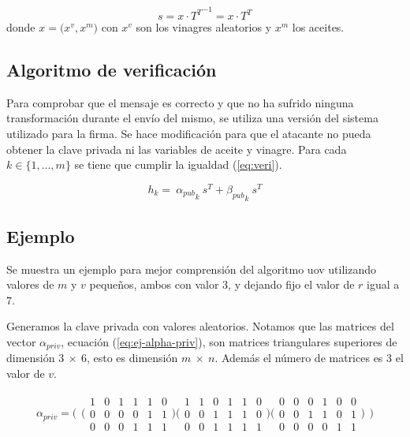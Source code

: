 \begin{equation}\label{eq:firma}
	s = x \cdot {T^{\scriptscriptstyle T}}^{-1} = x \cdot T ^{\scriptscriptstyle T}
\end{equation}
donde $x = \big(x^v, x^m\big)$ con $x^v$ son los vinagres aleatorios y $x^m$ los aceites.




\subsection{Algoritmo de verificación}

Para comprobar que el mensaje es correcto y que no ha sufrido ninguna transformación durante el envío del mismo, se utiliza una versión del sistema utilizado para la firma. Se hace modificación para que el atacante no pueda obtener la clave privada ni las variables de aceite y vinagre. Para cada $k \in  \{1,\dots, m\}$ se tiene que cumplir la igualdad (\ref{eq:veri}).


\begin{equation}\label{eq:veri}
	h_k = \ {\alpha_{pub}}_k \ s^{\scriptscriptstyle T} + {\beta_{pub}}_{k} \ s^{\scriptscriptstyle T}
\end{equation}

\subsection{Ejemplo}

Se muestra un ejemplo para mejor comprensión del algoritmo \acrshort{uov} utilizando valores de $m$ y $v$ pequeños, ambos con valor $3$, y dejando fijo el valor de $r$ igual a $7$.

Generamos la clave privada con valores aleatorios. Notamos que las matrices del vector $\alpha_{priv}$, ecuación (\ref{eq:ej-alpha-priv}), son matrices triangulares superiores de dimensión $3\ \times\ 6$, esto es dimensión $m\ \times\ n$. Además el número de matrices es $3$ el valor de $v$.

\begin{equation}\label{eq:ej-alpha-priv}
{\alpha_{priv}} = 
	\Bigg(\begin{matrix}
	\Big(\begin{smallmatrix}
		1 & 0 & 1 & 1 & 1 & 0\\
		0 & 0 & 0 & 0 & 1 & 1\\
		0 & 0 & 0 & 1 & 1 & 1
	\end{smallmatrix}\Big)
		
	\Big(\begin{smallmatrix}
		1 & 1 & 0 & 1 & 1 & 0\\
		0 & 0 & 1 & 1 & 1 & 0\\
		0 & 0 & 1 & 1 & 1 & 1
	\end{smallmatrix}\Big)
	
	\Big(\begin{smallmatrix}
		0 & 0 & 0 & 1 & 0 & 0\\
		0 & 0 & 1 & 1 & 0 & 1\\
		0 & 0 & 0 & 0 & 1 & 1
	\end{smallmatrix}\Big)
	\end{matrix}\Bigg)
\end{equation}

